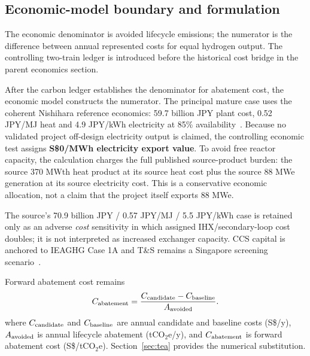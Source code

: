 \subsection{Economic-model boundary and formulation}

The economic denominator is avoided lifecycle emissions; the numerator is the difference between annual represented costs for equal hydrogen output. The controlling two-train ledger is introduced before the historical cost bridge in the parent economics section.

After the carbon ledger establishes the denominator for abatement cost, the economic model constructs the numerator. The principal mature case uses the coherent Nishihara reference economics: 59.7 billion JPY plant cost, 0.52 JPY/MJ heat and 4.9 JPY/kWh electricity at 85\% availability~\cite{nishihara2007potential}. Because no validated project off-design electricity output is claimed, the controlling economic test assigns \textbf{S\$0/MWh electricity export value}. To avoid free reactor capacity, the calculation charges the full published source-product burden: the source 370 MWth heat product at its source heat cost plus the source 88 MWe generation at its source electricity cost. This is a conservative economic allocation, not a claim that the project itself exports 88 MWe.

The source's 70.9 billion JPY / 0.57 JPY/MJ / 5.5 JPY/kWh case is retained only as an adverse \emph{cost} sensitivity in which assigned IHX/secondary-loop cost doubles; it is not interpreted as increased exchanger capacity. CCS capital is anchored to IEAGHG Case 1A and T\&S remains a Singapore screening scenario~\cite{ieaghg2017smr,mticcs2025cost}.

Forward abatement cost remains
\begin{equation}\label{eq:abatement-cost-definition}
C_{\rm abatement}=\frac{C_{\rm candidate}-C_{\rm baseline}}{A_{\rm avoided}}.
\end{equation}
where $C_{\rm candidate}$ and $C_{\rm baseline}$ are annual candidate and baseline costs (S\$/y), $A_{\rm avoided}$ is annual lifecycle abatement (tCO$_2$e/y), and $C_{\rm abatement}$ is forward abatement cost (S\$/tCO$_2$e). Section~\ref{sec:tea} provides the numerical substitution.

